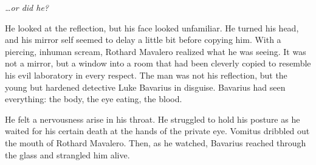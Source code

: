 {\em {\ldots}or did he?}



He looked at the reflection, but his face looked unfamiliar. He
turned his head, and his mirror self seemed to delay a little bit
before copying him. With a piercing, inhuman scream, Rothard
Mavalero realized what he was seeing. It was not a mirror, but a
window into a room that had been cleverly copied to resemble his
evil laboratory in every respect. The man was not his reflection,
but the young but hardened detective Luke Bavarius in disguise.
Bavarius had seen everything: the body, the eye eating, the
blood.



He felt a nervousness arise in his throat. He struggled to hold his
posture as he waited for his certain death at the hands of the
private eye. Vomitus dribbled out the mouth of Rothard Mavalero.
Then, as he watched, Bavarius reached through the glass and
strangled him alive. 
 



